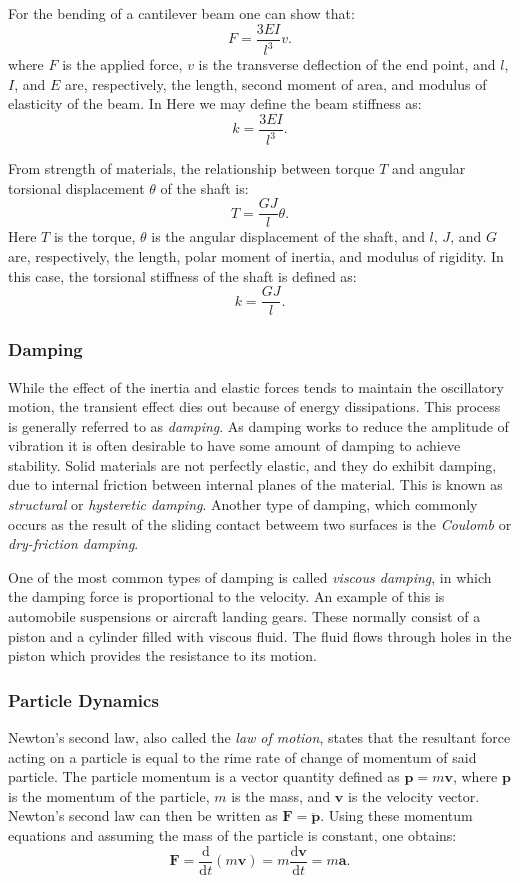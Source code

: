 For the bending of a cantilever beam one can show that:
\[ 
F = \frac{3 EI}{l^3} v
.\]
where $F$ is the applied force, $v$ is the transverse deflection of the end point, and $l$, $I$, and $E$ are, respectively, the length, second moment of area, and modulus of elasticity of the beam. In Here we may define the beam stiffness as:
\[ 
k = \frac{3 EI}{l^3}
.\]

From strength of materials, the relationship between torque $T$ and angular torsional displacement $\theta$ of the shaft is:
\[ 
T = \frac{GJ}{l} \theta
.\]
Here $T$ is the torque, $\theta$ is the angular displacement of the shaft, and $l$, $J$, and $G$ are, respectively, the length, polar moment of inertia, and modulus of rigidity. In this case, the torsional stiffness of the shaft is defined as:
\[ 
k = \frac{GJ}{l}
.\]

\subsubsection{Damping}
While the effect of the inertia and elastic forces tends to maintain the oscillatory motion, the transient effect dies out because of energy dissipations. This process is generally referred to as \textit{damping}. As damping works to reduce the amplitude of vibration it is often desirable to have some amount of damping to achieve stability. Solid materials are not perfectly elastic, and they do exhibit damping, due to internal friction between internal planes of the material. This is known as \textit{structural} or \textit{hysteretic damping}. Another type of damping, which commonly occurs as the result of the sliding contact betweem two surfaces is the \textit{Coulomb} or \textit{dry-friction damping}.

One of the most common types of damping is called \textit{viscous damping}, in which the damping force is proportional to the velocity. An example of this is automobile suspensions or aircraft landing gears. These normally consist of a piston and a cylinder filled with viscous fluid. The fluid flows through holes in the piston which provides the resistance to its motion. 

\subsubsection{Particle Dynamics}
Newton's second law, also called the \textit{law of motion}, states that the resultant force acting on a particle is equal to the rime rate of change of momentum of said particle. The particle momentum is a vector quantity defined as $\textbf{p} = m \textbf{v}$, where $\textbf{p}$ is the momentum of the particle, $m$ is the mass, and $\textbf{v}$ is the velocity vector. Newton's second law can then be written as $\textbf{F} = \ddot{\textbf{p}}$. Using these momentum equations and assuming the mass of the particle is constant, one obtains:
\[ 
\textbf{F} = \frac{\mathrm{d}}{\mathrm{d}t} \left( m \textbf{v} \right) = m \frac{\mathrm{d} \textbf{v}}{\mathrm{d}t} = m \textbf{a}
.\]

